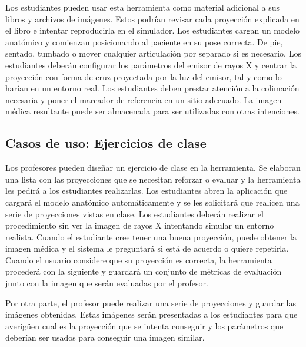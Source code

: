 Los estudiantes pueden usar esta herramienta como material adicional a sus libros y archivos de imágenes. Estos podrían revisar cada proyección explicada en el libro e intentar reproducirla en el simulador. Los estudiantes cargan un modelo anatómico y comienzan posicionando al paciente en su pose correcta. De pie, sentado, tumbado o mover cualquier articulación por separado si es necesario. Los estudiantes deberán configurar los parámetros del emisor de rayos X y centrar la proyección con forma de cruz proyectada por la luz del emisor, tal y como lo harían en un entorno real. Los estudiantes deben prestar atención a la colimación necesaria y poner el marcador de referencia en un sitio adecuado. La imagen médica resultante puede ser almacenada para ser utilizadas con otras intenciones.



\subsection{Casos de uso: Ejercicios de clase}

Los profesores pueden diseñar un ejercicio de clase en la herramienta. Se elaboran una lista con las proyecciones que se necesitan reforzar o evaluar y la herramienta les pedirá a los estudiantes realizarlas. Los estudiantes abren la aplicación que cargará el modelo anatómico automáticamente y se les solicitará que realicen una serie de proyecciones vistas en clase. Los estudiantes deberán realizar el procedimiento sin ver la imagen de rayos X intentando simular un entorno realista. Cuando el estudiante cree tener una buena proyección, puede obtener la imagen médica y el sistema le preguntará si está de acuerdo o quiere repetirla. Cuando el usuario considere que su proyección es correcta, la herramienta procederá con la siguiente y guardará un conjunto de métricas de evaluación junto con la imagen que serán evaluadas por el profesor. 


Por otra parte, el profesor puede realizar una serie de proyecciones y guardar las imágenes obtenidas. Estas imágenes serán presentadas a los estudiantes para que averigüen cual es la proyección que se intenta conseguir y los parámetros que deberían ser usados para conseguir una imagen similar.




